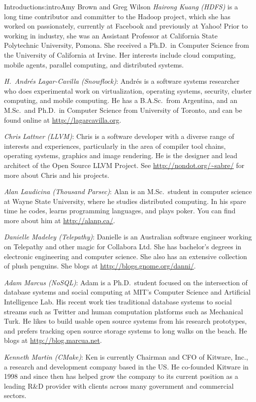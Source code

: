 \begin{aosachapter}{Introduction}{s:intro}{Amy Brown and Greg Wilson}
\emph{Hairong Kuang (HDFS)} is a long time contributor and committer
to the Hadoop project, which she has worked on passionately, currently
at Facebook and previously at Yahoo! Prior to working in industry, she was an
Assistant Professor at California State Polytechnic University,
Pomona. She received a Ph.D.\ in Computer Science from the University of
California at Irvine.  Her interests include cloud computing, mobile
agents, parallel computing, and distributed systems.

\emph{H.\ Andr\'{e}s Lagar-Cavilla (Snowflock)}:
Andr\'{e}s is a software systems researcher who does
experimental work on virtualization, operating systems, security,
cluster computing, and mobile computing. He has a B.A.Sc.\ from
Argentina, and an M.Sc.\ and Ph.D.\ in Computer Science from University
of Toronto, and can be found online
at \url{http://lagarcavilla.org}.

\emph{Chris Lattner (LLVM)}: Chris is a software developer
with a diverse range of interests and experiences, particularly in
the area of compiler tool chains, operating systems, graphics and
image rendering.  He is the designer and lead architect of the
Open Source LLVM Project.
See \url{http://nondot.org/~sabre/}
for more about Chris and his projects.

\emph{Alan Laudicina (Thousand Parsec)}: Alan is an M.Sc.\ 
student in computer science at Wayne State University, where he
studies distributed computing. In his spare time he codes, learns
programming languages, and plays poker.  You can find more about
him at \url{http://alanp.ca/}.

\emph{Danielle Madeley (Telepathy)}: Danielle is an
Australian software engineer working on Telepathy and other magic
for Collabora Ltd. She has bachelor's degrees in electronic
engineering and computer science. She also has an extensive
collection of plush penguins.  She blogs
at \url{http://blogs.gnome.org/danni/}.

\emph{Adam Marcus (NoSQL)}: Adam is a Ph.D.\ student focused on the
intersection of database systems and social computing at MIT's Computer Science
and Artificial Intelligence Lab.  His recent work ties traditional database
systems to social streams such as Twitter and human computation platforms such
as Mechanical Turk. He likes to build usable open source systems from his
research prototypes, and prefers tracking open source storage systems to long
walks on the beach. He blogs at \url{http://blog.marcua.net}.

\emph{Kenneth Martin (CMake)}: Ken is currently Chairman
and CFO of Kitware, Inc., a research and development company based
in the US\@. He co-founded Kitware in 1998 and since then has helped
grow the company to its current position as a leading R\&D
provider with clients across many government and commercial
sectors.


\end{aosachapter}
